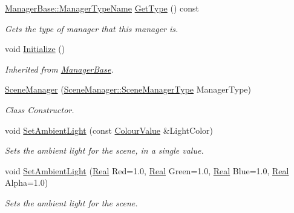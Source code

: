 \begin{DoxyCompactItemize}
\hyperlink{classphys_1_1ManagerBase_aaa6ccddf23892eaccb898529414f80a5}{ManagerBase::ManagerTypeName} \hyperlink{classphys_1_1SceneManager_af2b4f6bc50d40ffe06f6172c3d1dd02d}{GetType} () const 
\begin{DoxyCompactList}\small\item\em Gets the type of manager that this manager is. \item\end{DoxyCompactList}\item 
\hypertarget{classphys_1_1SceneManager_aa13b380a4e38f706a1977237fc4b165e}{
void \hyperlink{classphys_1_1SceneManager_aa13b380a4e38f706a1977237fc4b165e}{Initialize} ()}
\label{classphys_1_1SceneManager_aa13b380a4e38f706a1977237fc4b165e}

\begin{DoxyCompactList}\small\item\em Inherited from \hyperlink{classphys_1_1ManagerBase}{ManagerBase}. \item\end{DoxyCompactList}\item 
\hyperlink{classphys_1_1SceneManager_a6a6a5b747704d3f4bb724f1b893e2695}{SceneManager} (\hyperlink{classphys_1_1SceneManager_a14fe15dcf41564fdf12f3e11c1a4b774}{SceneManager::SceneManagerType} ManagerType)
\begin{DoxyCompactList}\small\item\em Class Constructor. \item\end{DoxyCompactList}\item 
void \hyperlink{classphys_1_1SceneManager_af5af99740fefeb411caff8fd004b4103}{SetAmbientLight} (const \hyperlink{classphys_1_1ColourValue}{ColourValue} \&LightColor)
\begin{DoxyCompactList}\small\item\em Sets the ambient light for the scene, in a single value. \item\end{DoxyCompactList}\item 
void \hyperlink{classphys_1_1SceneManager_a686b7199aff8db87af84f40ec933809a}{SetAmbientLight} (\hyperlink{namespacephys_af7eb897198d265b8e868f45240230d5f}{Real} Red=1.0, \hyperlink{namespacephys_af7eb897198d265b8e868f45240230d5f}{Real} Green=1.0, \hyperlink{namespacephys_af7eb897198d265b8e868f45240230d5f}{Real} Blue=1.0, \hyperlink{namespacephys_af7eb897198d265b8e868f45240230d5f}{Real} Alpha=1.0)
\begin{DoxyCompactList}\small\item\em Sets the ambient light for the scene. \item\end{DoxyCompactList}\item 

\end{DoxyCompactItemize}
